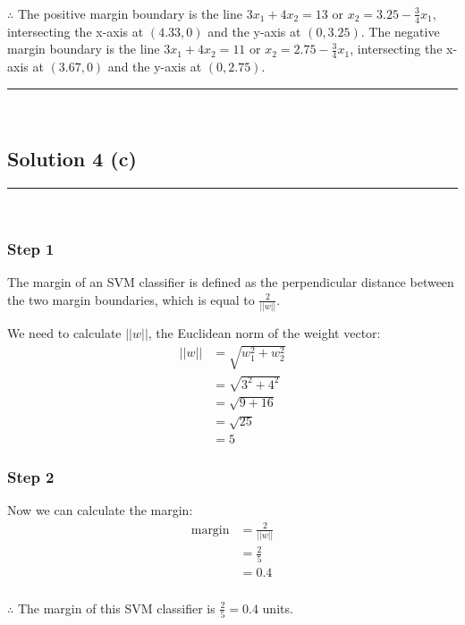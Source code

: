 \documentclass{article}
\begin{document}
\subsubsection*{\normalfont}{$\therefore$ The positive margin boundary is the line $3x_1 + 4x_2 = 13$ or $x_2 = 3.25 - \frac{3}{4}x_1$, intersecting the x-axis at $(4.33, 0)$ and the y-axis at $(0, 3.25)$. The negative margin boundary is the line $3x_1 + 4x_2 = 11$ or $x_2 = 2.75 - \frac{3}{4}x_1$, intersecting the x-axis at $(3.67, 0)$ and the y-axis at $(0, 2.75)$.}

\noindent\rule{\textwidth}{0.4pt}\\

\newpage

\subsection*{Solution 4 (c)}
\noindent\rule{\textwidth}{0.4pt}\\

\subsubsection*{Step 1}
\parbox{\textwidth}{
The margin of an SVM classifier is defined as the perpendicular distance between the two margin boundaries, which is equal to $\frac{2}{||w||}$.

We need to calculate $||w||$, the Euclidean norm of the weight vector:
\begin{align}
||w|| &= \sqrt{w_1^2 + w_2^2}\\
&= \sqrt{3^2 + 4^2}\\
&= \sqrt{9 + 16}\\
&= \sqrt{25}\\
&= 5
\end{align}
}

\subsubsection*{Step 2}
\parbox{\textwidth}{
Now we can calculate the margin:
\begin{align}
\text{margin} &= \frac{2}{||w||}\\
&= \frac{2}{5}\\
&= 0.4
\end{align}
}

\subsubsection*{\normalfont}{$\therefore$ The margin of this SVM classifier is $\frac{2}{5} = 0.4$ units.}
\end{document}

